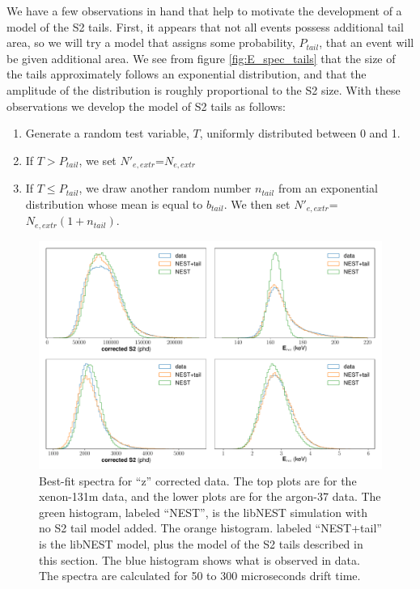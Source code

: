  We have a few observations in hand that help to motivate the development of a model of the S2 tails. First, it appears that not all events possess additional tail area, so we will try a model that assigns some probability, $P_{tail}$, that an event will be given additional area. We see from figure \ref{fig:E_spec_tails} that the size of the tails approximately follows an exponential distribution, and that the amplitude of the distribution is roughly proportional to the S2 size. With these observations we develop the model of S2 tails as follows:
\begin{enumerate}
\item Generate a random test variable, $T$, uniformly distributed between 0 and 1.
\item If $T>P_{tail}$, we set $N'_{e,extr}$=$N_{e,extr}$
\item If $T\leq P_{tail}$, we draw another random number $n_{tail}$ from an exponential distribution whose mean is equal to $b_{tail}$. We then set $N'_{e,extr}$=$N_{e,extr}(1+n_{tail})$.
\end{enumerate}
\begin{figure}[h!]
  \centering
  \includegraphics[width=\textwidth]{Figures/S2tail_hists_z.pdf}
\caption{Best-fit spectra for ``z'' corrected data. The top plots are for the xenon-131m data, and the lower plots are for the argon-37 data. The green histogram, labeled ``NEST'', is the libNEST simulation with no S2 tail model added. The orange histogram. labeled ``NEST+tail'' is the libNEST model, plus the model of the S2 tails described in this section. The blue histogram shows what is observed in data. The spectra are calculated for 50 to 300 microseconds drift time.  }
\label{fig:s2bestfit_spec_z}
\end{figure}

